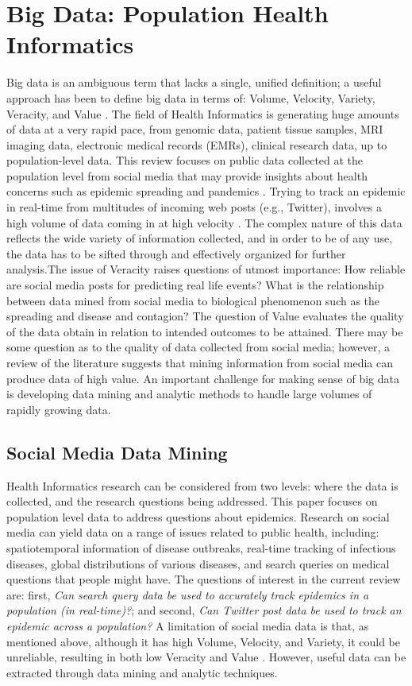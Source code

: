\documentclass[sigconf]{acmart}
\begin{document}
\section{Big Data: Population Health Informatics}

Big data is an ambiguous term that lacks a single, unified definition; a useful approach has been to define big data in terms of: Volume, Velocity, Variety, Veracity, and Value \cite{demchenko12}. The field of Health Informatics is generating huge amounts of data at a very rapid pace, from genomic data, patient tissue samples, MRI imaging data, electronic medical records (EMRs), clinical research data, up to population-level data. This review focuses on public data collected at the population level from social media that may provide insights about health concerns such as epidemic spreading and pandemics  \cite{hay13, herland14}. Trying to track an epidemic in real-time from multitudes of incoming web posts (e.g., Twitter), involves a high volume of data coming in at high velocity \cite{lamb13, paul14}. The complex nature of this data reflects the wide variety of information collected, and in order to be of any use, the data has to be sifted through and effectively organized for further analysis.The issue of Veracity raises questions of utmost importance: How reliable are social media posts for predicting real life events? What is the relationship between data mined from social media to biological phenomenon such as the spreading and disease and contagion? The question of Value evaluates the quality of the data obtain in relation to intended outcomes to be attained. There may be some question as to the quality of data collected from social media; however, a review of the literature suggests that mining information from social media can produce data of high value. An important challenge for making sense of big data is developing data mining and analytic methods to handle large volumes of rapidly growing data. 


\subsection{Social Media Data Mining}

Health Informatics research can be considered from two levels: where the data is collected, and the research questions being addressed. This paper focuses on population level data to address questions about epidemics. Research on social media can yield data on a range of issues related to public health, including: spatiotemporal information of disease outbreaks, real-time tracking of infectious diseases, global distributions of various diseases, and search queries on medical questions that people might have. The questions of interest in the current review are: first, \textit{Can search query data be used to accurately track epidemics in a population (in real-time)?};  and second, \textit{Can Twitter post data be used to track an epidemic across a population?} A limitation of social media data is that, as mentioned above, although it has high Volume, Velocity, and Variety, it could be unreliable, resulting in both low Veracity and Value \cite{hay14, lazer14}. However, useful data can be extracted through data mining and analytic techniques. 
\end{document}
